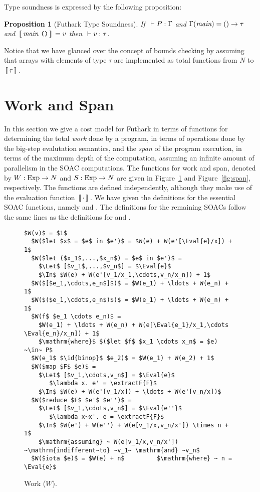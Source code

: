 \documentclass[oneside,11pt]{book}
\newtheorem{proposition}{Proposition}
\begin{document}
Type soundness is expressed by the following proposition:

\begin{proposition}[Futhark Type Soundness]
  If $~\vdash P : \Gamma$ and $\Gamma(\mbox{\it{main}}) = () \rightarrow \tau$ and
  $\,[\![\,\mbox{\it{main}}~\texttt{()}\,]\!]\, = v$ then $~\vdash v : \tau$.
\end{proposition}

Notice that we have glanced over the concept of bounds checking by
assuming that arrays with elements of type $\tau$ are implemented as
total functions from $N$ to $\,[\![\,\tau\,]\!]\,$.

\section{Work and Span}

In this section we give a cost model for Futhark in terms of functions
for determining the total \emph{work} done by a program, in terms of
operations done by the big-step evalutation semantics, and the
\emph{span} of the program execution, in terms of the maximum depth of
the computation, assuming an infinite amount of parallelism in the
SOAC computations. The functions for work and span, denoted by
$W : \mathrm{Exp} \rightarrow N$ and
$S : \mathrm{Exp} \rightarrow N$ are given in Figure~\ref{fig:work}
and Figure~\ref{fig:span}, respectively. The functions are defined
independently, although they make use of the evaluation function
$\,[\![\,\cdot\,]\!]\,$. We have given the definitions for the essential SOAC
functions, namely  and . The definitions for the
remaining SOACs follow the same lines as the definitions for 
and .

\begin{figure}
\begin{lstlisting}[mathescape=true]
  $W(v)$ = $1$
  $W($let $x$ = $e$ in $e')$ = $W(e) + W(e'[\Eval{e}/x]) + 1$
  $W($let ($x_1$,...,$x_n$) = $e$ in $e')$ =
    $\Let$ [$v_1$,...,$v_n$] = $\Eval{e}$
    $\In$ $W(e) + W(e'[v_1/x_1,\cdots,v_n/x_n]) + 1$
  $W($[$e_1,\cdots,e_n$]$)$ = $W(e_1) + \ldots + W(e_n) + 1$
  $W($($e_1,\cdots,e_n$)$)$ = $W(e_1) + \ldots + W(e_n) + 1$
  $W(f$ $e_1 \cdots e_n)$ =
    $W(e_1) + \ldots + W(e_n) + W(e[\Eval{e_1}/x_1,\cdots \Eval{e_n}/x_n]) + 1$
    $\mathrm{where}$ $($let $f$ $x_1 \cdots x_n$ = $e) ~\in~ P$
  $W(e_1$ $\id{binop}$ $e_2)$ = $W(e_1) + W(e_2) + 1$
  $W($map $F$ $e)$ =
    $\Let$ [$v_1,\cdots,v_n$] = $\Eval{e}$
       $\lambda x. e' = \extractF{F}$
    $\In$ $W(e) + W(e'[v_1/x]) + \ldots + W(e'[v_n/x])$
  $W($reduce $F$ $e'$ $e'')$ =
    $\Let$ [$v_1,\cdots,v_n$] = $\Eval{e''}$
       $\lambda x~x'. e = \extractF{F}$
    $\In$ $W(e') + W(e'') + W(e[v_1/x,v_n/x']) \times n + 1$
    $\mathrm{assuming} ~ W(e[v_1/x,v_n/x']) ~\mathrm{indifferent~to} ~v_1~ \mathrm{and} ~v_n$
  $W($iota $e)$ = $W(e) + n$         $\mathrm{where} ~ n = \Eval{e}$
\end{lstlisting}

\caption{Work ($W$).}
\label{fig:work}
\end{figure}
\end{document}
